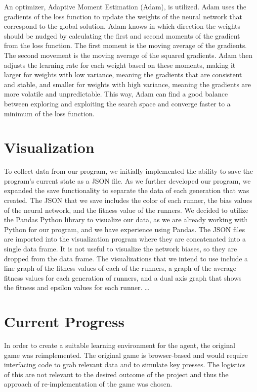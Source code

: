 \documentclass[letterpaper]{article} %
\begin{document}
\par An optimizer, Adaptive Moment Estimation (Adam), is utilized. Adam uses the gradients of the loss function to update the weights of the neural network that correspond to the global solution. Adam knows in which direction the weights should be nudged by calculating the first and second moments of the gradient from the loss function. The first moment is the moving average of the gradients. The second movement is the moving average of the squared gradients. Adam then adjusts the learning rate for each weight based on these moments, making it larger for weights with low variance, meaning the gradients that are consistent and stable, and smaller for weights with high variance, meaning the gradients are more volatile and unpredictable. This way, Adam can find a good balance between exploring and exploiting the search space and converge faster to a minimum of the loss function.

\section{Visualization}

\par To collect data from our program, we initially implemented the ability to save the program's current state as a JSON file. As we further developed our program, we expanded the save functionality to separate the data of each generation that was created. The JSON that we save includes the color of each runner, the bias values of the neural network, and the fitness value of the runners. We decided to utilize the Pandas Python library to visualize our data, as we are already working with Python for our program, and we have experience using Pandas. The JSON files are imported into the visualization program where they are concatenated into a single data frame. It is not useful to visualize the network biases, so they are dropped from the data frame. The visualizations that we intend to use include a line graph of the fitness values of each of the runners, a graph of the average fitness values for each generation of runners, and a dual axis graph that shows the fitness and epsilon values for each runner.
\dots

\section{Current Progress}

In order to create a suitable learning environment for the agent, the original game was reimplemented. The original game is browser-based and would require interfacing code to grab relevant data and to simulate key presses. The logistics of this are not relevant to the desired outcome of the project and thus the approach of re-implementation of the game was chosen.
\end{document}
